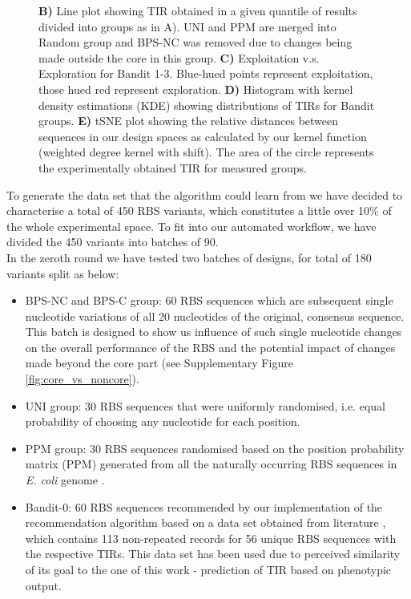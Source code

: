 \documentclass{article}
\newcommand{\mengyan}[1]{\textcolor{magenta}{#1}}
\begin{document}
\begin{figure}[!ht]
{    \textbf{B)} Line plot showing TIR obtained in a given quantile of results divided into groups as in A).
    UNI and PPM are merged into Random group and BPS-NC was removed due to changes being made outside the core in this group. 
    \textbf{C)} Exploitation v.s. Exploration for Bandit 1-3. Blue-hued points represent exploitation, those hued red represent exploration. 
    \textbf{D)} Histogram with kernel density estimations (KDE) showing distributions of TIRs for Bandit groups.
    \textbf{E)} tSNE plot showing the relative distances between sequences in our design spaces as calculated by our kernel function (weighted degree kernel with shift). 
    The area of the circle represents the experimentally obtained TIR for measured groups.}
    \label{fig: Swarmplot and Quantplot}
\end{figure}

To generate the data set that the algorithm could learn from we have decided to characterise a total of 450 RBS variants, which constitutes a little over 10\% of the whole experimental space. 
To fit into our automated workflow, we have divided the 450 variants into batches of 90.\\

In the zeroth round we have tested two batches of designs, for total of 180 variants split as below: 

\begin{itemize}
    \item BPS-NC and BPS-C group: 60 RBS sequences which are subsequent single nucleotide variations of all 20 nucleotides of the original, consensus sequence. This batch is designed to show us influence of such single nucleotide changes on the overall performance of the RBS and the potential impact of changes made beyond the core part (see Supplementary Figure \ref{fig:core_vs_noncore}).
    \item UNI group: 30 RBS sequences that were  uniformly randomised, i.e. equal probability of choosing any nucleotide for each position. 
    \item PPM group: 30 RBS sequences randomised based on the position probability matrix (PPM) generated from all the naturally occurring RBS sequences in \emph{E. coli} genome \cite{Stormo1982}.
    \item Bandit-0: 60 RBS sequences recommended by our implementation of the recommendation algorithm based on a data set obtained from literature \cite{jervis2018machine}, which contains 113 non-repeated records for 56 unique RBS sequences with the respective TIRs.
    This data set has been used due to perceived similarity of its goal to the one of this work - prediction of TIR based on phenotypic output.
\end{itemize}
\end{document}

